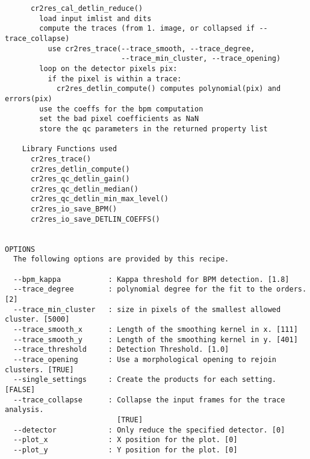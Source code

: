 \begin{verbatim}
      cr2res_cal_detlin_reduce()                                          
        load input imlist and dits                                        
        compute the traces (from 1. image, or collapsed if --trace_collapse)
          use cr2res_trace(--trace_smooth, --trace_degree,                
                           --trace_min_cluster, --trace_opening)          
        loop on the detector pixels pix:                                  
          if the pixel is within a trace:                                 
            cr2res_detlin_compute() computes polynomial(pix) and errors(pix)
        use the coeffs for the bpm computation                            
        set the bad pixel coefficients as NaN                             
        store the qc parameters in the returned property list             
                                                                          
    Library Functions used                                                
      cr2res_trace()                                                      
      cr2res_detlin_compute()                                             
      cr2res_qc_detlin_gain()                                             
      cr2res_qc_detlin_median()                                           
      cr2res_qc_detlin_min_max_level()                                    
      cr2res_io_save_BPM()                                                
      cr2res_io_save_DETLIN_COEFFS()                                      
  

OPTIONS
  The following options are provided by this recipe.

  --bpm_kappa           : Kappa threshold for BPM detection. [1.8]
  --trace_degree        : polynomial degree for the fit to the orders. [2]
  --trace_min_cluster   : size in pixels of the smallest allowed cluster. [5000]
  --trace_smooth_x      : Length of the smoothing kernel in x. [111]
  --trace_smooth_y      : Length of the smoothing kernel in y. [401]
  --trace_threshold     : Detection Threshold. [1.0]
  --trace_opening       : Use a morphological opening to rejoin clusters. [TRUE]
  --single_settings     : Create the products for each setting. [FALSE]
  --trace_collapse      : Collapse the input frames for the trace analysis.
                          [TRUE]
  --detector            : Only reduce the specified detector. [0]
  --plot_x              : X position for the plot. [0]
  --plot_y              : Y position for the plot. [0]

\end{verbatim}
